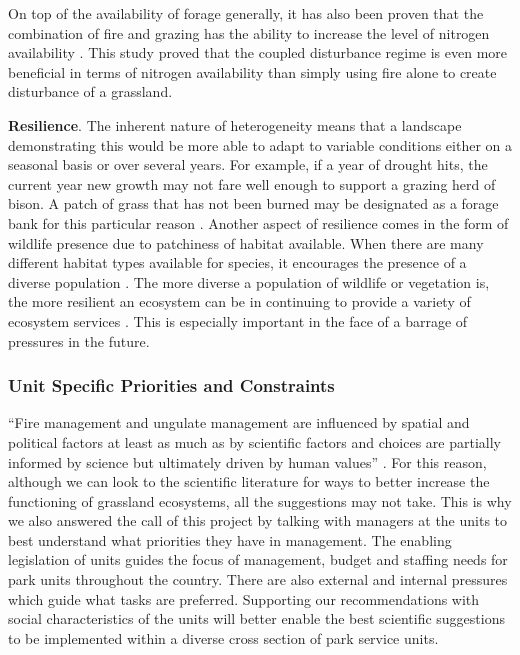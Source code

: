 On top of the availability of forage generally, it has also been proven that the combination of fire and grazing has the ability to increase the level of nitrogen availability \citep{anderson2006}. 
This study proved that the coupled disturbance regime is even more beneficial in terms of nitrogen availability than simply using fire alone to create disturbance of a grassland.

\textbf{Resilience}. 
The inherent nature of heterogeneity means that a landscape demonstrating this would be more able to adapt to variable conditions either on a seasonal basis or over several years. 
For example, if a year of drought hits, the current year new growth may not fare well enough to support a grazing herd of bison. 
A patch of grass that has not been burned may be designated as a forage bank for this particular reason \citep{mcgranahan2013a}. 
Another aspect of resilience comes in the form of wildlife presence due to patchiness of habitat available. 
When there are many different habitat types available for species, it encourages the presence of a diverse population \citep{moranz2012,ricketts2016}. 
The more diverse a
population of wildlife or vegetation is, the more resilient an ecosystem can be in continuing to provide a variety of ecosystem services
\citep{peterson1998,walker2012}. 
This is especially important in the face of a barrage of pressures in the future.

\hypertarget{unit-specific-priorities-and-constraints}{%
\subsubsection{Unit Specific Priorities and
		Constraints}\label{unit-specific-priorities-and-constraints}}

``Fire management and ungulate management are influenced by spatial and political factors at least as much as by scientific factors and choices are partially informed by science but ultimately driven by human values'' \citep{cole2012}. 
For this reason, although we can look to the scientific literature for ways to better increase the functioning of grassland ecosystems, all the suggestions may not take. 
This is why we also answered the call of this project by talking with managers at the units to best understand what priorities they have in management. 
The enabling legislation of units guides the focus of management, budget and staffing needs for park units throughout the country. 
There are also external and internal pressures which guide what tasks are preferred.
Supporting our recommendations with social characteristics of the units will better enable the best scientific suggestions to be implemented within a diverse cross section of park service units.

